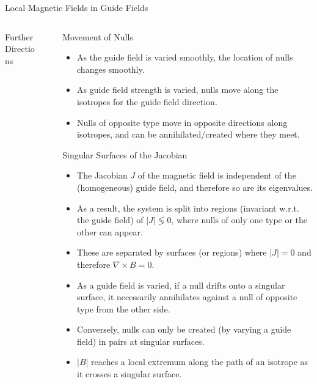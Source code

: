 \documentclass[final]{beamer}
\newlength{\sepwid}
\newlength{\onecolwid}
\newlength{\twocolwid}
\begin{document}
\begin{frame}[t]
\begin{columns}[t]
\begin{column}{\twocolwid}
\begin{block}{\huge{Local Magnetic Fields in Guide Fields}}
\begin{columns}[t,totalwidth=\twocolwid]
\begin{column}{\onecolwid}
\begin{block}{\huge Further Directions}
\end{block}

\end{column}
\begin{column}{\sepwid}\end{column} %
\begin{column}{\onecolwid}
\begin{block}{Movement of Nulls}
  \begin{itemize}
    \item As the guide field is varied smoothly, the location of nulls changes smoothly.
    \item As guide field strength is varied, nulls move along the isotropes for the guide field direction.
    \item Nulls of opposite type move in opposite directions along isotropes,
      and can be annihilated/created where they meet.
  \end{itemize}
\end{block}

\begin{block}{Singular Surfaces of the Jacobian}
  \begin{itemize}
    \item The Jacobian $J$ of the magnetic field is independent of the (homogeneous) guide field,
      and therefore so are its eigenvalues.
    \item As a result, the system is split into regions (invariant w.r.t. the guide field) of $|J|\lessgtr 0$,
      where nulls of only one type or the other can appear.
    \item These are separated by surfaces (or regions) where $|J|=0$ and therefore $\nabla\times B=0$.
    \item As a guide field is varied, if a null drifts onto a singular surface, it necessarily annihilates
      against a null of opposite type from the other side.
    \item Conversely, nulls can only be created (by varying a guide field) in pairs at singular surfaces.
    \item $|B|$ reaches a local extremum along the path of an isotrope as it crosses a singular surface.
    \end{itemize}
\end{block}


\end{column}
\end{columns}
\end{block}
\end{column}
\end{columns}
\end{frame}
\end{document}
